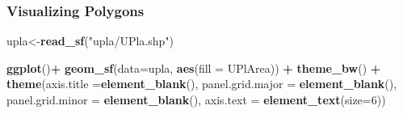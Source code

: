 \documentclass[
  shownotes,
  xcolor={svgnames},
  hyperref={colorlinks,citecolor=DarkBlue,linkcolor=DarkRed,urlcolor=DarkBlue}
  ]{beamer}
\newenvironment{Shaded}{\begin{snugshade}}{\end{snugshade}}
\newcommand{\DataTypeTok}[1]{\textcolor[rgb]{0.13,0.29,0.53}{#1}}
\newcommand{\DecValTok}[1]{\textcolor[rgb]{0.00,0.00,0.81}{#1}}
\newcommand{\KeywordTok}[1]{\textcolor[rgb]{0.13,0.29,0.53}{\textbf{#1}}}
\newcommand{\NormalTok}[1]{#1}
\newcommand{\OperatorTok}[1]{\textcolor[rgb]{0.81,0.36,0.00}{\textbf{#1}}}
\newcommand{\StringTok}[1]{\textcolor[rgb]{0.31,0.60,0.02}{#1}}
\begin{document}
\begin{frame}[fragile]
\frametitle{Visualizing  Polygons}


\begin{minipage}[t]{0.52\linewidth}
        \begin{scriptsize}

\begin{Shaded}
\begin{Highlighting}[]
\NormalTok{upla\textless{}{-}}\KeywordTok{read\_sf}\NormalTok{(}\StringTok{"upla/UPla.shp"}\NormalTok{)}

\KeywordTok{ggplot}\NormalTok{()}\OperatorTok{+}
\StringTok{  }\KeywordTok{geom\_sf}\NormalTok{(}\DataTypeTok{data=}\NormalTok{upla, }\KeywordTok{aes}\NormalTok{(}\DataTypeTok{fill =}\NormalTok{ UPlArea)) }\OperatorTok{+}
\StringTok{  }\KeywordTok{theme\_bw}\NormalTok{() }\OperatorTok{+}
\StringTok{  }\KeywordTok{theme}\NormalTok{(}\DataTypeTok{axis.title =}\KeywordTok{element\_blank}\NormalTok{(),}
        \DataTypeTok{panel.grid.major =} \KeywordTok{element\_blank}\NormalTok{(),}
        \DataTypeTok{panel.grid.minor =} \KeywordTok{element\_blank}\NormalTok{(),}
        \DataTypeTok{axis.text =} \KeywordTok{element\_text}\NormalTok{(}\DataTypeTok{size=}\DecValTok{6}\NormalTok{))}
\end{Highlighting}
\end{Shaded}
  \end{scriptsize}
    \end{minipage}
    \hfill
    \begin{minipage}[t]{0.43\linewidth}%
        \begin{figure}[H] \centering
            \captionsetup{justification=centering}


\end{figure}
\end{minipage}
\end{frame}
\end{document}
